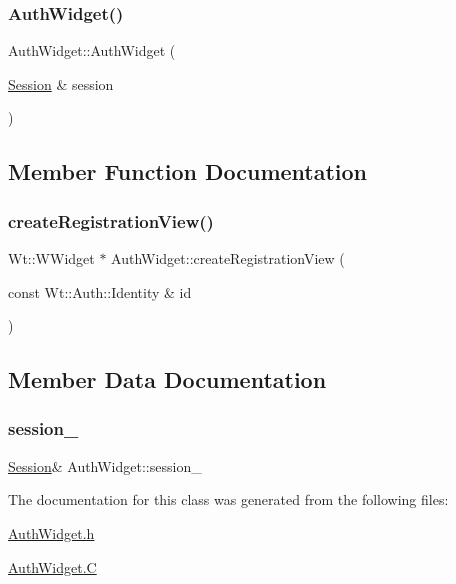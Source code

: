 \subsubsection{\texorpdfstring{Auth\+Widget()}{AuthWidget()}}
{\footnotesize\ttfamily Auth\+Widget\+::\+Auth\+Widget (\begin{DoxyParamCaption}\item[{\hyperlink{class_session}{Session} \&}]{session }\end{DoxyParamCaption})}



\subsection{Member Function Documentation}
\mbox{\label{class_auth_widget_abfa295703272e72a5d57dd736cc9f329}} 
\subsubsection{\texorpdfstring{create\+Registration\+View()}{createRegistrationView()}}
{\footnotesize\ttfamily Wt\+::\+W\+Widget $\ast$ Auth\+Widget\+::create\+Registration\+View (\begin{DoxyParamCaption}\item[{const Wt\+::\+Auth\+::\+Identity \&}]{id }\end{DoxyParamCaption})\hspace{0.3cm}{\ttfamily [virtual]}}



\subsection{Member Data Documentation}
\mbox{\label{class_auth_widget_a9c1a0d3bf5d59ec8f0f6c7672e37224c}} 
\subsubsection{\texorpdfstring{session\+\_\+}{session\_}}
{\footnotesize\ttfamily \hyperlink{class_session}{Session}\& Auth\+Widget\+::session\+\_\+\hspace{0.3cm}{\ttfamily [private]}}



The documentation for this class was generated from the following files\+:\begin{DoxyCompactItemize}
\item 
\hyperlink{_auth_widget_8h}{Auth\+Widget.\+h}\item 
\hyperlink{_auth_widget_8_c}{Auth\+Widget.\+C}\end{DoxyCompactItemize}
